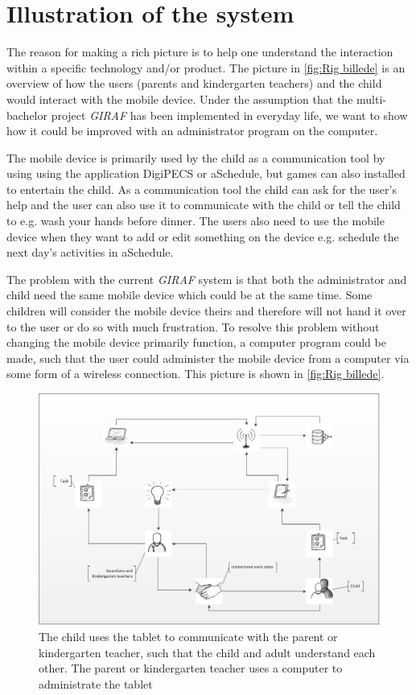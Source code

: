 \section{Illustration of the system}
The reason for making a rich picture is to help one understand the interaction within a specific technology and/or product\cite{OOAD}. The picture in \vref{fig:Rig billede} is an overview of how the users (parents and kindergarten teachers) and the child would interact with the mobile device. Under the assumption that the multi-bachelor project \textit{GIRAF} has been implemented in everyday life, we want to show how it could be improved with an administrator program on the computer.

The mobile device is primarily used by the child as a communication tool by using using the application DigiPECS or aSchedule, but games can also installed to entertain the child. As a communication tool the child can ask for the user's help and the user can also use it to communicate with the child or tell the child to e.g. wash your hands before dinner. 
The users also need to use the mobile device when they want to add or edit something on the device e.g. schedule the next day's activities in aSchedule.  

 
The problem with the current \textit{GIRAF} system is that both the administrator and child need the same mobile device which could be at the same time. Some children will consider the mobile device theirs and therefore will not hand it over to the user or do so with much frustration. To resolve this problem without changing the mobile device primarily function, a computer program could be made, such that the user could administer the mobile device from a computer via some form of a wireless connection. This picture is shown in \vref{fig:Rig billede}. 

\begin{figure}[ht]
	\centering
		\includegraphics[width=1.00\textwidth]{img/Rig_billede2.jpg}
	\caption{The child uses the tablet to communicate with the parent or kindergarten teacher, such that the child and adult understand each other. The parent or kindergarten teacher uses a computer to administrate the tablet}
	\label{fig:Rig billede}
\end{figure}

